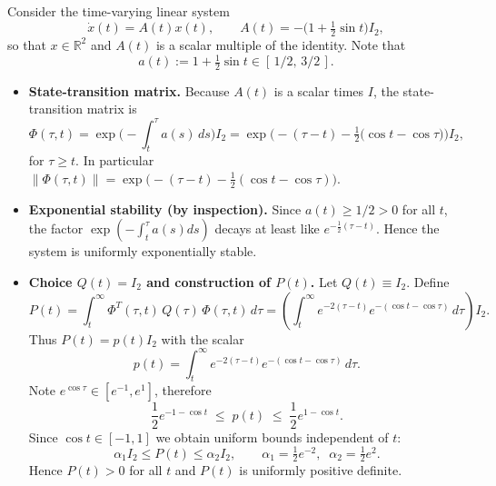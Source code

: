 \begin{example}
Consider the time-varying linear system
\begin{equation}
\dot x(t)=A(t)x(t),\qquad A(t) = -\big(1+\tfrac{1}{2}\sin t\big) I_{2},
\end{equation}
so that \(x\in\mathbb{R}^2\) and \(A(t)\) is a scalar multiple of the identity. Note that
\begin{equation}
a(t):=1+\tfrac{1}{2}\sin t \in [\,1/2,\,3/2\,].
\end{equation}

\begin{itemize}
    \item \textbf{State-transition matrix.} Because \(A(t)\) is a scalar times \(I\), the state-transition matrix is
    \begin{equation}
    \Phi(\tau,t)=\exp\bigg(-\int_{t}^{\tau} a(s)\,ds\bigg) I_2
    =\exp\!\Big(-( \tau-t ) -\tfrac{1}{2}\big(\cos t-\cos\tau\big)\Big) I_2,
    \end{equation}
    for \(\tau\ge t\). In particular \(\|\Phi(\tau,t)\|= \exp\big(-( \tau-t ) -\tfrac{1}{2}(\cos t-\cos\tau)\big)\).
    
    \item \textbf{Exponential stability (by inspection).} Since \(a(t)\ge 1/2>0\) for all \(t\), the factor \(\exp(-\int_t^\tau a(s)ds)\) decays at least like \(e^{-\tfrac{1}{2}(\tau-t)}\). Hence the system is uniformly exponentially stable.
    
    \item \textbf{Choice \(Q(t)=I_2\) and construction of \(P(t)\).} Let \(Q(t)\equiv I_2\). Define
    \begin{equation}
    P(t)=\int_{t}^{\infty}\Phi^{T}(\tau,t)\,Q(\tau)\,\Phi(\tau,t)\,d\tau
    =\left(\int_t^{\infty} e^{-2(\tau-t)} e^{-(\cos t-\cos\tau)}\,d\tau\right) I_2.
    \end{equation}
    Thus \(P(t)=p(t) I_2\) with the scalar
    \begin{equation}
    p(t)=\int_t^{\infty} e^{-2(\tau-t)} e^{-(\cos t-\cos\tau)}\,d\tau.
    \end{equation}
    Note \(e^{\cos\tau}\in[e^{-1},e^{1}]\), therefore
    \begin{equation}
    \frac{1}{2} e^{-1-\cos t} \;\le\; p(t) \;\le\; \frac{1}{2} e^{1-\cos t}.
    \end{equation}
    Since \(\cos t\in[-1,1]\) we obtain uniform bounds independent of \(t\):
    \begin{equation}
    \alpha_1 I_2 \le P(t) \le \alpha_2 I_2,\qquad
    \alpha_1=\tfrac{1}{2}e^{-2},\;\; \alpha_2=\tfrac{1}{2}e^{2}.
    \end{equation}
    Hence \(P(t)>0\) for all \(t\) and \(P(t)\) is uniformly positive definite.
    

\end{itemize}
\end{example}
